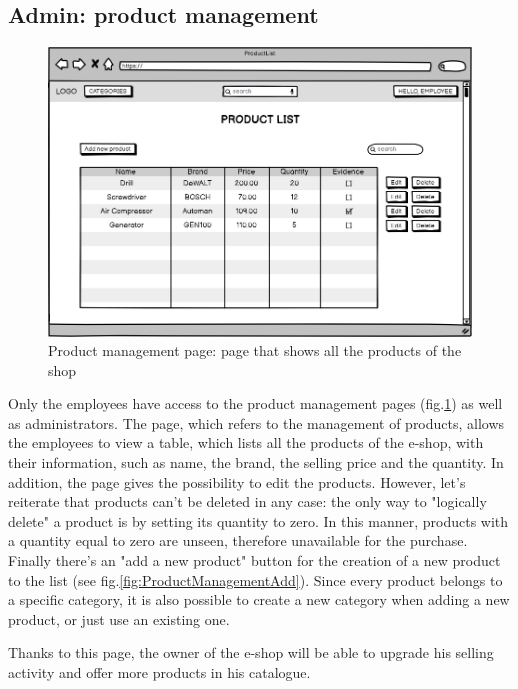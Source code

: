 \subsection{Admin: product management} 
    \begin{figure}[H]
        \centering
        \includegraphics[width=\textwidth,height=0.7\textheight,keepaspectratio]{mockups/productListPageMockup.png}
            \caption{Product management page: page that shows all the products of the shop}
            \label{fig:ProductManagement}
    \end{figure}
Only the employees have access to the product management pages (fig.\ref{fig:ProductManagement}) as well as administrators.
The page, which refers to the management of products, allows the employees to view a table, which lists all the products of the e-shop, with their information, such as name, the brand, the selling price and the quantity. 
In addition, the page gives the possibility to edit the products. However, let's reiterate that products can't be deleted in any case: the only way to "logically delete" a product is by setting its quantity to zero. In this manner, products with a quantity equal to zero are unseen, therefore unavailable for the purchase. 
Finally there's an "add a new product" button for the creation of a new product to the list (see fig.\ref{fig:ProductManagementAdd}). Since every product belongs to a specific category, it is also possible to create a new category when adding a new product, or just use an existing one.

Thanks to this page, the owner of the e-shop will be able to upgrade his selling activity and offer more products in his catalogue. 
    
